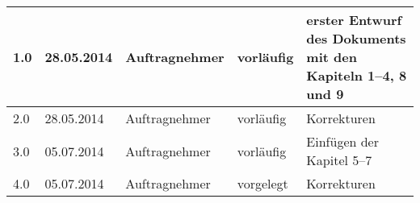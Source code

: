 \begin{longtable}{|m{1.78cm}|m{1.59cm}|m{2.86cm}|m{1.9cm}|m{5.25cm}|}
  1.0    &    28.05.2014    &    Auftragnehmer &  vorläufig &  erster Entwurf des Dokuments mit den Kapiteln 1--4, 8 und 9\\
  \hline 
  2.0    &    28.05.2014    &    Auftragnehmer &  vorläufig &  Korrekturen\\
  \hline
  3.0 	& 05.07.2014 & Auftragnehmer & vorläufig & Einfügen der Kapitel 5--7\\
  \hline
    4.0 	& 05.07.2014 & Auftragnehmer & vorgelegt & Korrekturen \\
  \hline

\end{longtable}

